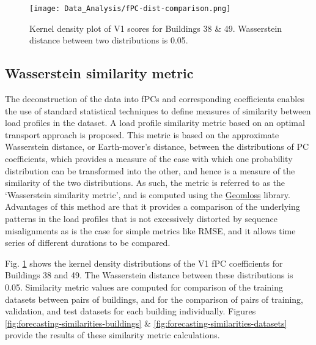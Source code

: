 \begin{subappendices}
    \begin{figure}[p]
        \centering
        \texttt{[image: Data\_Analysis/fPC-dist-comparison.png]}
        \caption{Kernel density plot of V1 scores for Buildings 38 \& 49. Wasserstein distance between two distributions is 0.05.}
        \label{fig:forecasting-fPC-comparison}
    \end{figure}

    \subsection{Wasserstein similarity metric} \label{forecasting-similarity-metrics}

    The deconstruction of the data into fPCs and corresponding coefficients enables the use of standard statistical techniques to define measures of similarity between load profiles in the dataset. A load profile similarity metric based on an optimal transport approach is proposed. This metric is based on the approximate Wasserstein distance, or Earth-mover's distance, between the distributions of PC coefficients, which provides a measure of the ease with which one probability distribution can be transformed into the other, and hence is a measure of the similarity of the two distributions. As such, the metric is referred to as the `Wasserstein similarity metric', and is computed using the \href{https://github.com/jeanfeydy/geomloss}{Geomloss} \citep{feydy2024JeanfeydyGeomloss} library. Advantages of this method are that it provides a comparison of the underlying patterns in the load profiles that is not excessively distorted by sequence misalignments as is the case for simple metrics like RMSE, and it allows time series of different durations to be compared.


    Fig. \ref{fig:forecasting-fPC-comparison} shows the kernel density distributions of the V1 fPC coefficients for Buildings 38 and 49. The Wasserstein distance between these distributions is 0.05. Similarity metric values are computed for comparison of the training datasets between pairs of buildings, and for the comparison of pairs of training, validation, and test datasets for each building individually. Figures \ref{fig:forecasting-similarities-buildings} \& \ref{fig:forecasting-similarities-datasets} provide the results of these similarity metric calculations.


\end{subappendices}
